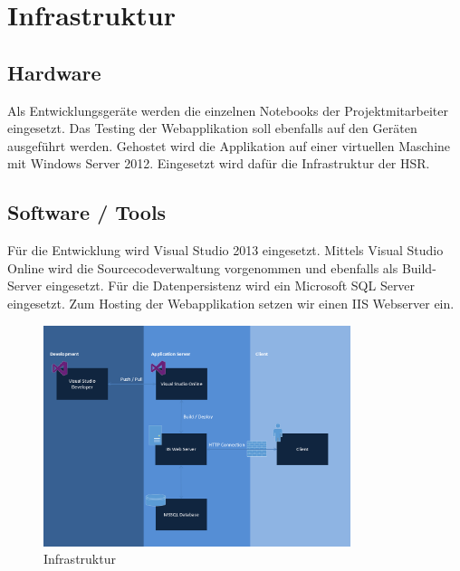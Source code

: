 \chapter{Infrastruktur}

\section{Hardware}
Als Entwicklungsgeräte werden die einzelnen Notebooks der Projektmitarbeiter eingesetzt. Das Testing der Webapplikation soll ebenfalls auf den Geräten ausgeführt werden. Gehostet wird die Applikation auf einer virtuellen Maschine mit Windows Server 2012. Eingesetzt wird dafür die Infrastruktur der HSR.

\section{Software / Tools}
Für die Entwicklung wird Visual Studio 2013 eingesetzt. Mittels Visual Studio Online wird die Sourcecodeverwaltung vorgenommen und ebenfalls als Build-Server eingesetzt. Für die Datenpersistenz wird ein Microsoft SQL Server eingesetzt. Zum Hosting der Webapplikation setzen wir einen IIS Webserver ein.
\begin{figure}[h]
    \centering
    \includegraphics[width=0.8\textwidth]{content/images/infrastruktur.png}
    \caption{Infrastruktur}
\end{figure}
